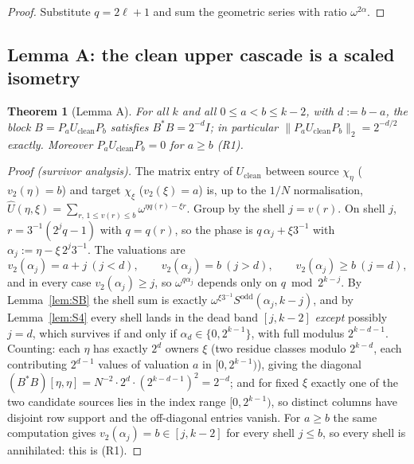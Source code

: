 \documentclass[12pt,a4paper]{article}
\newtheorem{theorem}{Theorem}[section]
\newcommand{\vtwo}{v_2}
\newcommand{\Sodd}{S^{\mathrm{odd}}}
\begin{document}
\begin{proof}
Substitute $q = 2\ell + 1$ and sum the geometric series with ratio $\omega^{2\alpha}$.
\end{proof}

\subsection{Lemma A: the clean upper cascade is a scaled isometry}

\begin{theorem}[Lemma A]\label{thm:lemmaA}
For all $k$ and all $0 \le a < b \le k-2$, with $d := b - a$, the block
$B = P_a U_{\mathrm{clean}} P_b$ satisfies $B^\ast B = 2^{-d} I$; in particular
$\|P_a U_{\mathrm{clean}} P_b\|_2 = 2^{-d/2}$ exactly. Moreover $P_a U_{\mathrm{clean}} P_b = 0$
for $a \ge b$ (R1).
\end{theorem}

\begin{proof}[Proof (survivor analysis)]
The matrix entry of $U_{\mathrm{clean}}$ between source $\chi_\eta$ ($\vtwo(\eta) = b$) and
target $\chi_\xi$ ($\vtwo(\xi) = a$) is, up to the $1/N$ normalisation,
$\hat{U}(\eta, \xi) = \sum_{r,\, 1 \le v(r) \le b} \omega^{\eta q(r) - \xi r}$. Group by the
shell $j = v(r)$. On shell $j$, $r = 3^{-1}(2^j q - 1)$ with $q = q(r)$, so the phase is
$q\,\alpha_j + \xi 3^{-1}$ with $\alpha_j := \eta - \xi\, 2^j 3^{-1}$. The valuations are
\[
  \vtwo(\alpha_j) = a + j \ (j < d), \qquad \vtwo(\alpha_j) = b \ (j > d), \qquad
  \vtwo(\alpha_j) \ge b \ (j = d),
\]
and in every case $\vtwo(\alpha_j) \ge j$, so $\omega^{q \alpha_j}$ depends only on
$q \bmod 2^{k-j}$. By Lemma~\ref{lem:SB} the shell sum is exactly
$\omega^{\xi 3^{-1}} \Sodd(\alpha_j, k-j)$, and by Lemma~\ref{lem:S4} every shell lands in the
dead band $[j, k-2]$ \emph{except} possibly $j = d$, which survives if and only if
$\alpha_d \in \{0, 2^{k-1}\}$, with full modulus $2^{k-d-1}$. Counting: each $\eta$ has exactly
$2^d$ owners $\xi$ (two residue classes modulo $2^{k-d}$, each contributing $2^{d-1}$ values of
valuation $a$ in $[0, 2^{k-1})$), giving the diagonal
$(B^\ast B)[\eta, \eta] = N^{-2} \cdot 2^d \cdot (2^{k-d-1})^2 = 2^{-d}$; and for fixed $\xi$
exactly one of the two candidate sources lies in the index range $[0, 2^{k-1})$, so distinct
columns have disjoint row support and the off-diagonal entries vanish. For $a \ge b$ the same
computation gives $\vtwo(\alpha_j) = b \in [j, k-2]$ for every shell $j \le b$, so every shell
is annihilated: this is (R1).
\end{proof}
\end{document}
